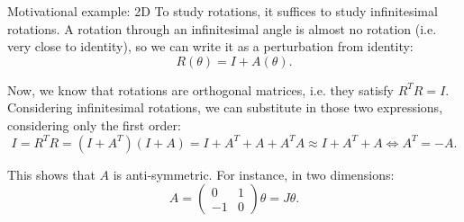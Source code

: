 \documentclass[a4paper]{article}
\begin{document}
\begin{parag}{Motivational example: 2D}
    To study rotations, it suffices to study infinitesimal rotations. A rotation through an infinitesimal angle is almost no rotation (i.e. very close to identity), so we can write it as a perturbation from identity: 
    \[R\left(\theta\right) = I + A\left(\theta\right).\]

    Now, we know that rotations are orthogonal matrices, i.e. they satisfy $R^T R = I$. Considering infinitesimal rotations, we can substitute in those two expressions, considering only the first order: 
    \[I = R^T R = \left(I + A^T\right)\left(I + A\right) = I + A^T + A + A^T A\approx I + A^T + A \iff A^T = -A.\]

    This shows that $A$ is anti-symmetric. For instance, in two dimensions:
    \[A = \begin{pmatrix} 0 & 1 \\ -1 & 0 \end{pmatrix} \theta = J \theta.\]
\end{parag} %
\end{document}

